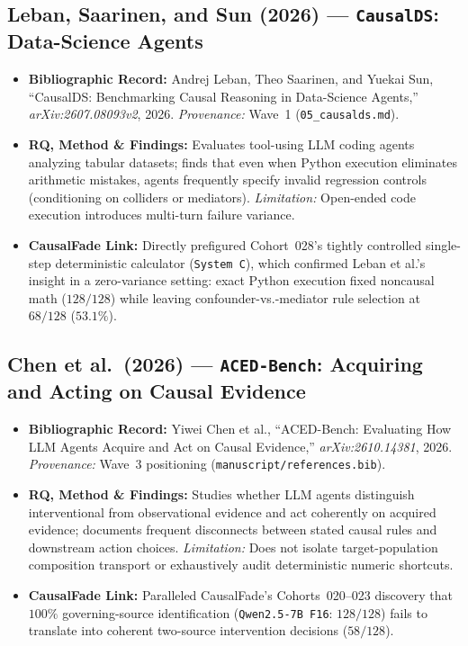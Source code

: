 \subsection{Leban, Saarinen, and Sun (2026) --- \texttt{CausalDS}: Data-Science Agents \citep{leban2026causalds}}
\begin{itemize}
  \item \textbf{Bibliographic Record:} Andrej Leban, Theo Saarinen, and Yuekai Sun, ``CausalDS: Benchmarking Causal Reasoning in Data-Science Agents,'' \emph{arXiv:2607.08093v2}, 2026. \emph{Provenance:} Wave~1 (\texttt{05\_causalds.md}).
  \item \textbf{RQ, Method \& Findings:} Evaluates tool-using LLM coding agents analyzing tabular datasets; finds that even when Python execution eliminates arithmetic mistakes, agents frequently specify invalid regression controls (conditioning on colliders or mediators). \emph{Limitation:} Open-ended code execution introduces multi-turn failure variance.
  \item \textbf{CausalFade Link:} Directly prefigured Cohort~028's tightly controlled single-step deterministic calculator (\texttt{System C}), which confirmed Leban et al.'s insight in a zero-variance setting: exact Python execution fixed noncausal math ($128/128$) while leaving confounder-vs.-mediator rule selection at $68/128$ ($53.1\%$).
\end{itemize}

\subsection{Chen et al.\ (2026) --- \texttt{ACED-Bench}: Acquiring and Acting on Causal Evidence \citep{chen2026acedbench}}
\begin{itemize}
  \item \textbf{Bibliographic Record:} Yiwei Chen et al., ``ACED-Bench: Evaluating How LLM Agents Acquire and Act on Causal Evidence,'' \emph{arXiv:2610.14381}, 2026. \emph{Provenance:} Wave~3 positioning (\texttt{manuscript/references.bib}).
  \item \textbf{RQ, Method \& Findings:} Studies whether LLM agents distinguish interventional from observational evidence and act coherently on acquired evidence; documents frequent disconnects between stated causal rules and downstream action choices. \emph{Limitation:} Does not isolate target-population composition transport or exhaustively audit deterministic numeric shortcuts.
  \item \textbf{CausalFade Link:} Paralleled CausalFade's Cohorts~020--023 discovery that $100\%$ governing-source identification (\texttt{Qwen2.5-7B F16}: $128/128$) fails to translate into coherent two-source intervention decisions ($58/128$).
\end{itemize}


